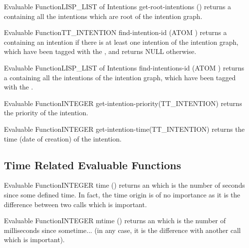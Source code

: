 \begin{typeefa}{Evaluable Function}{LISP\_LIST of Intentions}  {get-root-intentions} {()}
returns a  containing all the intentions  which are root of the
intention graph.
\end{typeefa}

\begin{typeefa}{Evaluable Function}{TT\_INTENTION} {find-intention-id} {(ATOM
)} 
returns a  containing an intention if there is at least one
intention of the intention graph, which have been tagged with the 
, and returns NULL otherwise.
\end{typeefa}

\begin{typeefa}{Evaluable Function}{LISP\_LIST of Intentions} {find-intentions-id} {(ATOM )}
returns a  containing all the intentions of the intention graph,
which have been tagged with the  .
\end{typeefa}

\begin{typeefa}{Evaluable Function}{INTEGER} {get-intention-priority}{(TT\_INTENTION)}
returns the priority of the intention.
\end{typeefa}

\begin{typeefa}{Evaluable Function}{INTEGER} {get-intention-time}{(TT\_INTENTION)}
returns the time (date of creation) of the intention.
\end{typeefa}

\subsection{Time Related Evaluable Functions}

\begin{typeefa}{Evaluable Function}{INTEGER} {time} {()}
returns an  which is the number of seconds since some defined
time. In fact, the time origin is of no importance as it is the difference
between two calls which is important.
\end{typeefa}

\begin{typeefa}{Evaluable Function}{INTEGER} {mtime} {()}
returns an  which is the number of milliseconds since sometime...
(in any case, it is the difference with another call which is important).
\end{typeefa}

